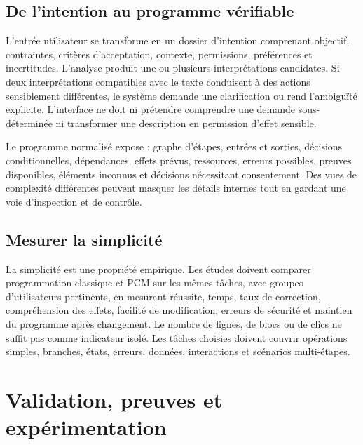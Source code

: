\documentclass[11pt,a4paper,openany]{book}
\theoremstyle{definition}
\theoremstyle{plain}
\theoremstyle{remark}
\begin{document}
\section{De l'intention au programme vérifiable}
L'entrée utilisateur se transforme en un dossier d'intention comprenant objectif, contraintes, critères d'acceptation, contexte, permissions, préférences et incertitudes. L'analyse produit une ou plusieurs interprétations candidates. Si deux interprétations compatibles avec le texte conduisent à des actions sensiblement différentes, le système demande une clarification ou rend l'ambiguïté explicite. L'interface ne doit ni prétendre comprendre une demande sous-déterminée ni transformer une description en permission d'effet sensible.

Le programme normalisé expose : graphe d'étapes, entrées et sorties, décisions conditionnelles, dépendances, effets prévus, ressources, erreurs possibles, preuves disponibles, éléments inconnus et décisions nécessitant consentement. Des vues de complexité différentes peuvent masquer les détails internes tout en gardant une voie d'inspection et de contrôle.

\section{Mesurer la simplicité}
La simplicité est une propriété empirique. Les études doivent comparer programmation classique et PCM sur les mêmes tâches, avec groupes d'utilisateurs pertinents, en mesurant réussite, temps, taux de correction, compréhension des effets, facilité de modification, erreurs de sécurité et maintien du programme après changement. Le nombre de lignes, de blocs ou de clics ne suffit pas comme indicateur isolé. Les tâches choisies doivent couvrir opérations simples, branches, états, erreurs, données, interactions et scénarios multi-étapes.

\chapter{Validation, preuves et expérimentation}
\end{document}
